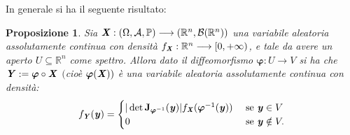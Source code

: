 \documentclass[11pt]{book}
\theoremstyle{Definizione}
\theoremstyle{TeoremaProposizioneLemmaCorollario}
\newtheorem{mypropo}[myteo]{Proposizione}
\theoremstyle{OsservazioneNota}
\newcommand{\R}{\mathbb{R}}
\newcommand{\gro}[1]{\textbf{\textup{#1}}}
\newcommand{\mybold}[1]{\boldsymbol{#1}}
\newcommand{\gri}[1]{\textbf{\textit{{#1}}}}
\renewcommand{\P}{\mathbb{P}}
\begin{document}
\noindent
In generale si ha il seguente risultato:
\begin{boxpro}
\begin{mypropo}
Sia $\gri{X}:(\Omega,\mathcal{A},\P) \longrightarrow (\R^n,\mathcal{B}(\R^n))$ una variabile aleatoria assolutamente continua con densità $f_{\gri{X}}:\R^n \longrightarrow [0,+\infty)$, e tale da avere un aperto $U\subseteq \R^n$ come spettro. Allora dato il diffeomorfismo $\mybold{\varphi}:U \longrightarrow V$ si ha che $\gri{Y}:= \mybold{\varphi}\circ \gri{X}$ $($cioè $\mybold{\varphi}(\gri{X}))$ è una variabile aleatoria assolutamente continua con densità:
$$
f_{\gri{Y}}(\gri{y}) = \begin{cases}
|\det\gro{J}_{\mybold{\varphi}^{-1}}(\gri{y})| f_{\gri{X}}(\mybold{\varphi}^{-1}(\gri{y})) &\textup{ se }\gri{y}\in V\\
0&\textup{ se }\gri{y}\notin V.
\end{cases}
$$
\end{mypropo}
\end{boxpro}
\end{document}
